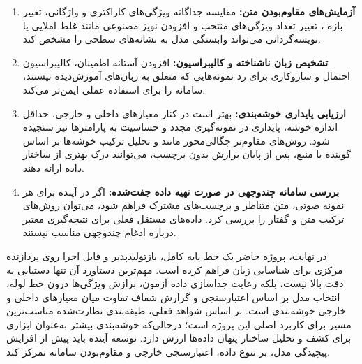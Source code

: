 \begin{enumerate}
	\item \textbf{آزمایش‌های مقاوم‌بودن متن:}
	مقایسه جداگانه ویژگی‌های کاراکتری و واژگانی، تغییر بازه
	،
	تغییر تعداد ویژگی‌های منتخب و افزودن نویز مصنوعی مانند غلط املایی یا نویسه‌گردانی می‌تواند وابستگی مدل به نشانه‌های سطحی را مشخص کند.

	\item \textbf{تشخیص زبان ناشناخته و کالیبراسیون:}
	افزودن آستانه اطمینان، کالیبراسیون احتمال و سازوکاری برای رد نمونه‌هایی که متعلق به زبان‌های آموزش‌دیده نیستند، سامانه را برای استفاده عملی ایمن‌تر می‌کند.

	\item \textbf{ارزیابی پایداری خوشه‌بندی:}
	بهتر است در کنار معیارهای داخلی و خارجی، حداقل اندازه خوشه، پایداری در نمونه‌گیری مجدد و حساسیت به پارامترها نیز سنجیده شود. روش‌های مقاوم‌تر چگالی‌محور مانند
	و تحلیل ترکیب خوشه‌ها بر اساس گوینده یا منبع، پس از پایان برازش بدون برچسب، می‌توانند درک بهتری از ساختار داده ارائه دهند.

	\item \textbf{بررسی سامانه چندوجهی در صورت تهیه داده جفت‌شده:}
	اگر در آینده برای هر نمونه صوتی، متن متناظر و برچسب‌های مشترک فراهم شود، می‌توان روش‌های ترکیب متن و گفتار را بررسی کرد. داده‌های مستقل فعلی برای نتیجه‌گیری معتبر درباره ادغام چندوجهی مناسب نیستند.
\end{enumerate}

در نهایت، پروژه حاضر یک خط پایه کامل، بازتولیدپذیر و قابل اجرا روی پردازنده مرکزی برای شناسایی زبان فراهم کرده است. مهم‌ترین دستاورد آن تنها دستیابی به دقت بالا نیست، بلکه رعایت جداسازی داده آزمون، برازش ویژگی‌ها درون خط لوله، انتخاب مدل بر اساس اعتبارسنجی و گزارش شفاف تفاوت میان معیارهای داخلی و خارجی خوشه‌بندی است. بر اساس شواهد فعلی، طبقه‌بندی نظارت‌شده مناسب‌ترین مسیر برای کاربرد اصلی این پروژه است؛ درحالی‌که خوشه‌بندی بیشتر به‌عنوان ابزاری برای کشف و تحلیل ساختار پنهان داده‌ها ارزش دارد. توسعه آینده باید پیش از افزایش پیچیدگی مدل، بر تنوع داده، اعتبارسنجی خارجی و مقاوم‌بودن سامانه تمرکز کند.

